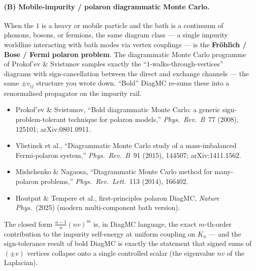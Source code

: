 \documentclass[11pt,a4paper]{article}
\begin{document}
\paragraph{(B) Mobile-impurity / polaron diagrammatic Monte Carlo.}
When the $1$ is a heavy or mobile particle and the bath is a continuum of
phonons, bosons, or fermions, the same diagram class --- a single
impurity worldline interacting with bath modes via vertex couplings ---
is the \textbf{Fr\"ohlich / Bose / Fermi polaron problem}. The diagrammatic
Monte Carlo programme of Prokof'ev \& Svistunov samples exactly the
``$1$-walks-through-vertices'' diagrams with sign-cancellation between the
direct and exchange channels --- the same $\pm v_{ij}$ structure you wrote
down. ``Bold'' DiagMC re-sums these into a renormalised propagator on
the impurity rail.
\begin{itemize}[leftmargin=2em,itemsep=1pt]
  \item Prokof'ev \& Svistunov, ``Bold diagrammatic Monte Carlo: a generic
        sign-problem-tolerant technique for polaron models,''
        \emph{Phys.\ Rev.\ B}~77 (2008), 125101; arXiv:0801.0911.
  \item Vlietinck et al., ``Diagrammatic Monte Carlo study of a
        mass-imbalanced Fermi-polaron system,'' \emph{Phys.\ Rev.\ B}~91
        (2015), 144507; arXiv:1411.1562.
  \item Mishchenko \& Nagaosa, ``Diagrammatic Monte Carlo method for
        many-polaron problems,'' \emph{Phys.\ Rev.\ Lett.}~113 (2014),
        166402.
  \item Houtput \& Tempere et al., first-principles polaron DiagMC,
        \emph{Nature Phys.}\ (2025) (modern multi-component bath version).
\end{itemize}
The closed form $\frac{n-1}{n}(nv)^m$ is, in DiagMC language, the exact
$m$-th-order contribution to the impurity self-energy at uniform coupling
on $K_n$ --- and the sign-tolerance result of bold DiagMC is exactly the
statement that signed sums of $(\pm v)$ vertices collapse onto a single
controlled scalar (the eigenvalue $nv$ of the Laplacian).
\end{document}
